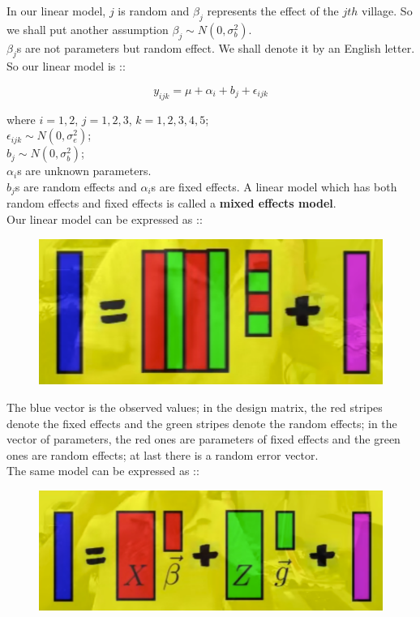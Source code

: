 \documentclass[11pt, a4paper]{article}\usepackage[]{graphicx}\usepackage[]{xcolor}
\begin{document}
In our linear model, $j$ is random and $\beta_j$ represents the effect of the $jth$ village. So we shall put another assumption $\beta_j \sim N(0, \sigma_b^2)$. \\

$\beta_j$s are not parameters but random effect. We shall denote it by an English letter. So our linear model is ::

$$y_{ijk} = \mu + \alpha_i + b_j + \epsilon_{ijk}$$

where $i = 1, 2$, $j = 1, 2, 3$, $k = 1, 2, 3, 4, 5$; \\

$\epsilon_{ijk} \sim N(0, \sigma_e^2)$; \\

$b_j \sim N(0, \sigma_b^2)$; \\

$\alpha_i$s are unknown parameters. \\

$b_j$s are random effects and $\alpha_i$s are fixed effects. A linear model which has both random effects and fixed effects is called a \textbf{mixed effects model}. \\


Our linear model can be expressed as :: 

\begin{figure}[h]
  \centering
  \includegraphics[scale = 0.5]{lm_1}
\end{figure}

The blue vector is the observed values; in the design matrix, the red stripes denote the fixed effects and the green stripes denote the random effects; in the vector of parameters, the red ones are parameters of fixed effects and the green ones are random effects; at last there is a random error vector. \\

The same model can be expressed as ::

\begin{figure}[h]
  \centering
  \includegraphics[scale = 0.5]{lm_2}
\end{figure}
\end{document}
